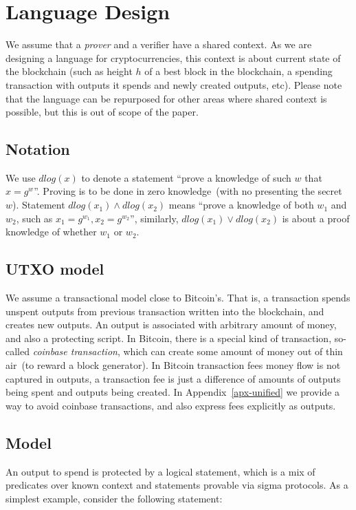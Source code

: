 \documentclass[11pt]{article}
\begin{document}
\section{Language Design}

We assume that a {\em prover} and a {verifier} have a shared context. As we are designing a language for cryptocurrencies, this context is about current state of the blockchain (such as height $h$ of a best block in the blockchain, a spending transaction with outputs it spends and newly created outputs, etc). Please note that the language can be repurposed for other areas where shared context is possible, but this is out of scope of the paper.

\subsection{Notation}

We use $dlog(x)$ to denote a statement ``prove a knowledge of such $w$ that $x = g^w$''. Proving is to be done in zero knowledge~(with no presenting the secret $w$). Statement $dlog(x_1) \land dlog(x_2)$ means ``prove a knowledge of both $w_1$ and $w_2$, such as $x_1 = g^{w_1}, x_2 = g^{w_2}$'', similarly, $dlog(x_1) \lor dlog(x_2)$ is about a proof knowledge of whether $w_1$ or $w_2$. 

\subsection{UTXO model}

We assume a transactional model close to Bitcoin's. That is, a transaction spends unspent outputs from previous transaction written into the blockchain, and creates new outputs. An output is associated with arbitrary amount of money, and also a protecting script. In Bitcoin, there is a special kind of transaction, so-called {\em coinbase transaction}, which can create some amount of money out of thin air~(to reward a block generator). In Bitcoin transaction fees money flow is not captured in outputs, a transaction fee is just a difference of amounts of outputs being spent and outputs being created. In Appendix~\ref{apx-unified} we provide a way to avoid coinbase transactions, and also express fees explicitly as outputs. 


\subsection{Model}

An output to spend is protected by a logical statement, which is a mix of predicates over known context and statements provable via sigma protocols. As a simplest example, consider the following statement:
\end{document}

